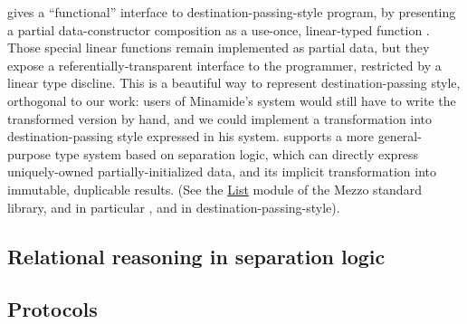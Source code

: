 \cite*{minamide-98} gives a ``functional'' interface to
destination-passing-style program, by presenting a partial
data-constructor composition  as a use-once,
linear-typed function . Those special
linear functions remain implemented as partial data, but they expose
a referentially-transparent interface to the programmer, restricted by
a linear type discline. This is a beautiful way to represent
destination-passing style, orthogonal to our work: users of Minamide's
system would still have to write the transformed version by hand, and
we could implement a transformation into destination-passing style
expressed in his system. \citet*{DBLP:journals/toplas/BalabonskiPP16}
supports a more general-purpose type system based on separation logic,
which can directly express uniquely-owned partially-initialized data,
and its implicit transformation into immutable, duplicable
results. (See the
\href{https://protz.github.io/mezzo/code_samples/list.mz.html}{List}
module of the Mezzo standard library, and in particular ,
 and  in destination-passing-style).


\subsection{Relational reasoning in separation logic}


\subsection{Protocols}



